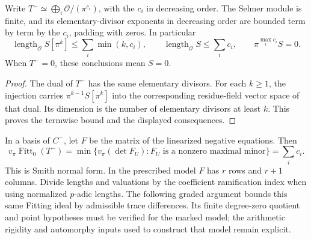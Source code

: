 \begin{corollary}\label{selmer-conormal-elementary}
Write $T^-\simeq\bigoplus_i\mathcal O/(\pi^{c_i})$, with the
$c_i$ in decreasing order. The Selmer module is finite, and its
elementary-divisor exponents in decreasing order are bounded term by
term by the $c_i$, padding with zeros. In particular
\[
 \operatorname{length}_{\mathcal O}S[\pi^k]
       \le\sum_i\min(k,c_i),\qquad
 \operatorname{length}_{\mathcal O}S\le\sum_i c_i,
 \qquad \pi^{\max_i c_i}S=0.
\]
When $T^-=0$, these conclusions mean $S=0$.
\end{corollary}
\begin{proof}
The dual of $T^-$ has the same elementary divisors. For each $k\ge1$,
the injection carries $\pi^{k-1}S[\pi^k]$ into the corresponding
residue-field vector space of that dual. Its dimension is the number
of elementary divisors at least $k$. This proves the termwise bound
and the displayed consequences.
\end{proof}

In a basis of $C^-$, let $F$ be the matrix of the linearized negative
equations. Then
\[
 v_\pi\operatorname{Fitt}_0(T^-)
     =\min\{v_\pi(\det F_U):F_U\text{ is a nonzero maximal minor}\}
     =\sum_i c_i.
\]
This is Smith normal form. In the prescribed model $F$ has $r$ rows
and $r+1$ columns. Divide lengths and valuations by the coefficient
ramification index when using normalized $p$-adic lengths.
The following graded argument bounds this same Fitting ideal by
admissible trace differences. Its finite degree-zero quotient and point hypotheses must
be verified for the marked model; the arithmetic rigidity and automorphy
inputs used to construct that model remain explicit.
